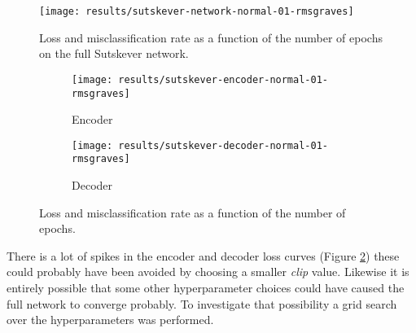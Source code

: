 \begin{figure}[h]
	\centering
	\texttt{[image: results/sutskever-network-normal-01-rmsgraves]}
	\caption{Loss and misclassification rate as a function of the number of epochs on the full Sutskever network.}
	\label{fig:results:sutskever:network-01}
\end{figure}
\begin{figure}[H]
        \vspace{-0.5cm}
        \centering
        \begin{subfigure}[b]{0.49\textwidth}
                \texttt{[image: results/sutskever-encoder-normal-01-rmsgraves]}
                \caption{Encoder}
        \end{subfigure}
        \begin{subfigure}[b]{0.49\textwidth}
                \texttt{[image: results/sutskever-decoder-normal-01-rmsgraves]}
                \caption{Decoder}
        \end{subfigure}
        \caption{Loss and misclassification rate as a function of the number of epochs.}
        \label{fig:results:sutskever:decoder-encoder-01}
\end{figure}

There is a lot of spikes in the encoder and decoder loss curves (Figure \ref{fig:results:sutskever:decoder-encoder-01}) these could probably have been avoided by choosing a smaller \textit{clip} value. Likewise it is entirely possible that some other hyperparameter choices could have caused the full network to converge probably. To investigate that possibility a grid search over the hyperparameters was performed.

